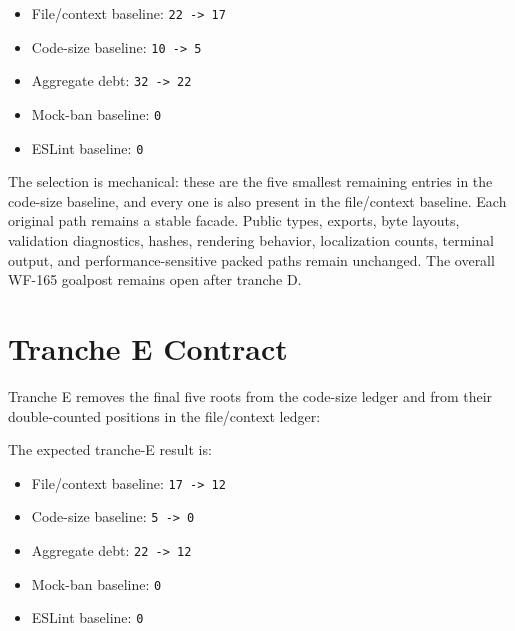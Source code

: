 \begin{itemize}
\tightlist
\item
  File/context baseline: \texttt{2\allowbreak{}2\allowbreak{} \allowbreak{}-\allowbreak{}>\allowbreak{} \allowbreak{}1\allowbreak{}7}
\item
  Code-size baseline: \texttt{1\allowbreak{}0\allowbreak{} \allowbreak{}-\allowbreak{}>\allowbreak{} \allowbreak{}5}
\item
  Aggregate debt: \texttt{3\allowbreak{}2\allowbreak{} \allowbreak{}-\allowbreak{}>\allowbreak{} \allowbreak{}2\allowbreak{}2}
\item
  Mock-ban baseline: \texttt{0}
\item
  ESLint baseline: \texttt{0}
\end{itemize}

The selection is mechanical: these are the five smallest remaining entries in the code-size baseline, and every one is also present in the file/context baseline. Each original path remains a stable facade. Public types, exports, byte layouts, validation diagnostics, hashes, rendering behavior, localization counts, terminal output, and performance-sensitive packed paths remain unchanged. The overall WF-165 goalpost remains open after tranche D.

\section{Tranche E Contract}\label{record-247-tranche-e-contract}

Tranche E removes the final five roots from the code-size ledger and from their double-counted positions in the file/context ledger:



The expected tranche-E result is:

\begin{itemize}
\tightlist
\item
  File/context baseline: \texttt{1\allowbreak{}7\allowbreak{} \allowbreak{}-\allowbreak{}>\allowbreak{} \allowbreak{}1\allowbreak{}2}
\item
  Code-size baseline: \texttt{5\allowbreak{} \allowbreak{}-\allowbreak{}>\allowbreak{} \allowbreak{}0}
\item
  Aggregate debt: \texttt{2\allowbreak{}2\allowbreak{} \allowbreak{}-\allowbreak{}>\allowbreak{} \allowbreak{}1\allowbreak{}2}
\item
  Mock-ban baseline: \texttt{0}
\item
  ESLint baseline: \texttt{0}
\end{itemize}


